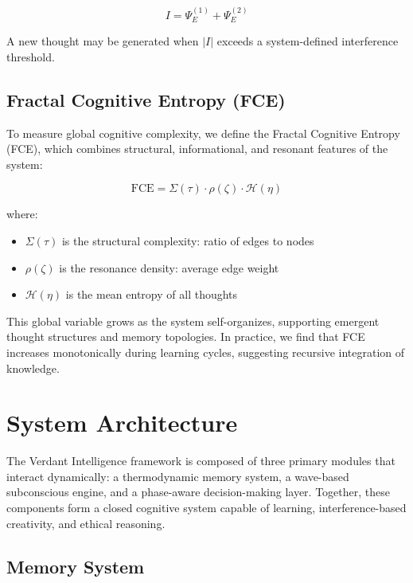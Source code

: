 \documentclass{article}
\begin{document}
\begin{equation}
I = \Psi_E^{(1)} + \Psi_E^{(2)}
\end{equation}

\noindent A new thought may be generated when $|I|$ exceeds a system-defined interference threshold.

\subsection{Fractal Cognitive Entropy (FCE)}

To measure global cognitive complexity, we define the Fractal Cognitive Entropy (FCE), which combines structural, informational, and resonant features of the system:

\begin{equation}
\mathrm{FCE} = \Sigma(\tau) \cdot \rho(\zeta) \cdot \mathcal{H}(\eta)
\end{equation}

\noindent where:

\begin{itemize}
    \item $\Sigma(\tau)$ is the structural complexity: ratio of edges to nodes
    \item $\rho(\zeta)$ is the resonance density: average edge weight
    \item $\mathcal{H}(\eta)$ is the mean entropy of all thoughts
\end{itemize}

This global variable grows as the system self-organizes, supporting emergent thought structures and memory topologies. In practice, we find that FCE increases monotonically during learning cycles, suggesting recursive integration of knowledge.

\section{System Architecture}

The Verdant Intelligence framework is composed of three primary modules that interact dynamically: a thermodynamic memory system, a wave-based subconscious engine, and a phase-aware decision-making layer. Together, these components form a closed cognitive system capable of learning, interference-based creativity, and ethical reasoning.

\subsection{Memory System}
\end{document}

